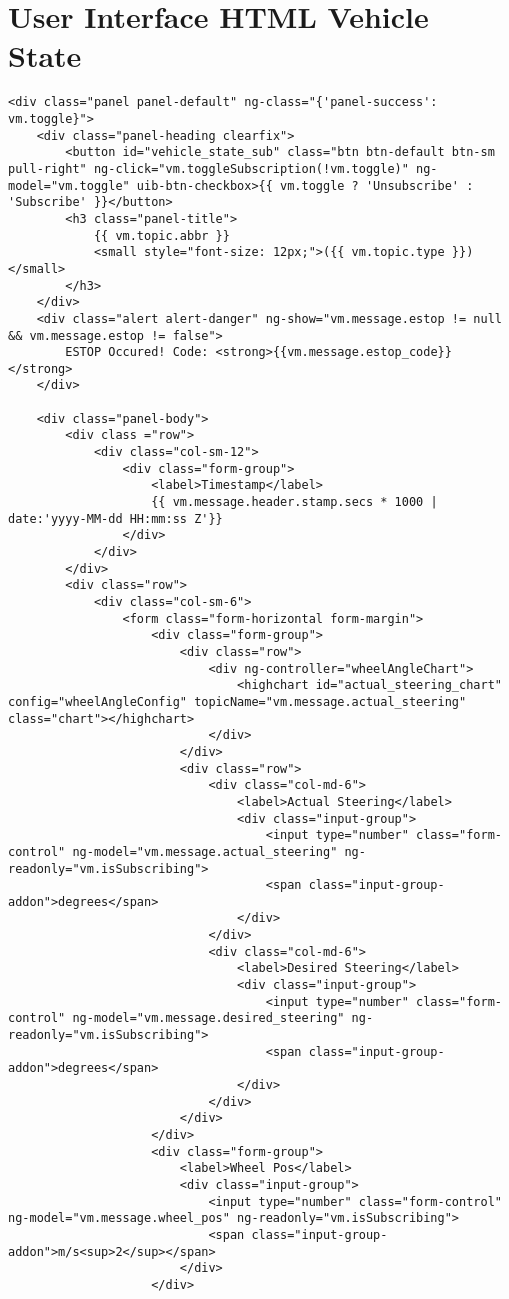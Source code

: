 \section{User Interface HTML Vehicle State}
\begin{verbatim}
<div class="panel panel-default" ng-class="{'panel-success': vm.toggle}">
    <div class="panel-heading clearfix">
        <button id="vehicle_state_sub" class="btn btn-default btn-sm pull-right" ng-click="vm.toggleSubscription(!vm.toggle)" ng-model="vm.toggle" uib-btn-checkbox>{{ vm.toggle ? 'Unsubscribe' : 'Subscribe' }}</button>
        <h3 class="panel-title">
            {{ vm.topic.abbr }}
            <small style="font-size: 12px;">({{ vm.topic.type }})</small>
        </h3>
    </div>
    <div class="alert alert-danger" ng-show="vm.message.estop != null && vm.message.estop != false">
        ESTOP Occured! Code: <strong>{{vm.message.estop_code}}</strong>
    </div>

    <div class="panel-body">
        <div class ="row">
            <div class="col-sm-12">
                <div class="form-group">
                    <label>Timestamp</label>
                    {{ vm.message.header.stamp.secs * 1000 | date:'yyyy-MM-dd HH:mm:ss Z'}}
                </div>
            </div>
        </div>
        <div class="row">
            <div class="col-sm-6">
                <form class="form-horizontal form-margin">
                    <div class="form-group">
                        <div class="row">
                            <div ng-controller="wheelAngleChart">
                                <highchart id="actual_steering_chart" config="wheelAngleConfig" topicName="vm.message.actual_steering" class="chart"></highchart>
                            </div>
                        </div>
                        <div class="row">
                            <div class="col-md-6">
                                <label>Actual Steering</label>
                                <div class="input-group">
                                    <input type="number" class="form-control" ng-model="vm.message.actual_steering" ng-readonly="vm.isSubscribing">
                                    <span class="input-group-addon">degrees</span>
                                </div>
                            </div>
                            <div class="col-md-6">
                                <label>Desired Steering</label>
                                <div class="input-group">
                                    <input type="number" class="form-control" ng-model="vm.message.desired_steering" ng-readonly="vm.isSubscribing">
                                    <span class="input-group-addon">degrees</span>
                                </div>
                            </div>
                        </div>
                    </div>
                    <div class="form-group">
                        <label>Wheel Pos</label>
                        <div class="input-group">
                            <input type="number" class="form-control" ng-model="vm.message.wheel_pos" ng-readonly="vm.isSubscribing">
                            <span class="input-group-addon">m/s<sup>2</sup></span>
                        </div>
                    </div>


\end{verbatim}
